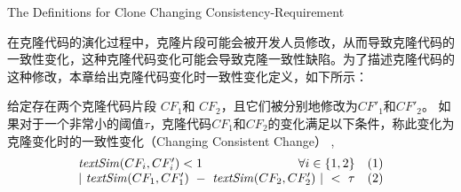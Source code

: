 




{The Definitions for Clone Changing Consistency-Requirement}

在克隆代码的演化过程中，克隆片段可能会被开发人员修改，从而导致克隆代码的一致性变化，这种克隆代码变化可能会导致克隆一致性缺陷。为了描述克隆代码的这种修改，本章给出克隆代码变化时一致性变化定义，如下所示：\\

\begin{definition}
\label{def-changingchange}
给定存在两个克隆代码片段 $CF_1$和 $CF_2$，且它们被分别地修改为$CF'_1$和$CF'_2$。  如果对于一个非常小的阈值$\tau$，克隆代码$CF_1$和$CF_2$的变化满足以下条件，称此变化为{克隆变化时的一致性变化（Changing Consistent Change）} , 
  \[
  \begin{array}[t]{crl}
    \mathit{textSim}(CF_i, CF'_i) < 1 & \forall i \in \{1,2\} &(1) \\
    \multicolumn{2}{c}{| ~\mathit{textSim}(CF_1,CF'_1)  ~-~ \mathit{textSim}(CF_2,CF'_2) ~| ~< ~ \tau}  & (2)
  \end{array}
  \]
\end{definition}

